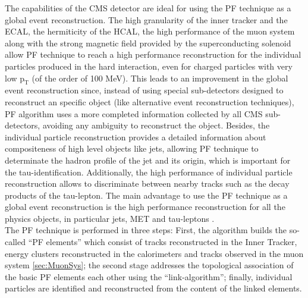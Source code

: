 The capabilities of the CMS detector are ideal for using the PF technique as a global event reconstruction. The high 
granularity of the inner tracker and the ECAL, the hermiticity of the HCAL, the high performance of the muon system 
along with the strong magnetic field provided by the superconducting solenoid allow PF technique to reach a 
high performance reconstruction for the individual particles produced in the hard interaction, even for charged particles
with very low $\textrm{p}_{\textrm{T}}$ (of the order of 100 MeV). This leads to an improvement in the global event 
reconstruction since, instead of using special sub-detectors designed to reconstruct an specific 
object (like alternative event reconstruction techniques), PF algorithm uses a more completed information collected 
by all CMS sub-detectors, avoiding any ambiguity to reconstruct the object. Besides, the 
individual particle reconstruction provides a detailed information 
about compositeness of high level objects like jets, allowing PF technique
to determinate the hadron profile of the jet and its origin, which is important for the tau-identification. 
Additionally, the high performance of individual particle reconstruction allows to discriminate between nearby tracks 
such as the decay products of the tau-lepton. The main advantage 
to use the PF technique as a global event reconstruction is the high performance reconstruction 
for all the physics objects, in particular jets, MET and tau-leptons \cite{CMS-PAS-PFT-10-001}.\\


The PF technique is performed in three steps: First, the algorithm builds the so-called ``PF elements'' which consist of tracks 
reconstructed in the Inner Tracker, energy clusters reconstructed in the calorimeters and tracks observed in the muon system \ref{sec:MuonSys};
the second stage addresses the topological association of the basic PF elements each other using the ``link-algorithm''; finally,
individual particles are identified and reconstructed from the content of the linked elements. \\


